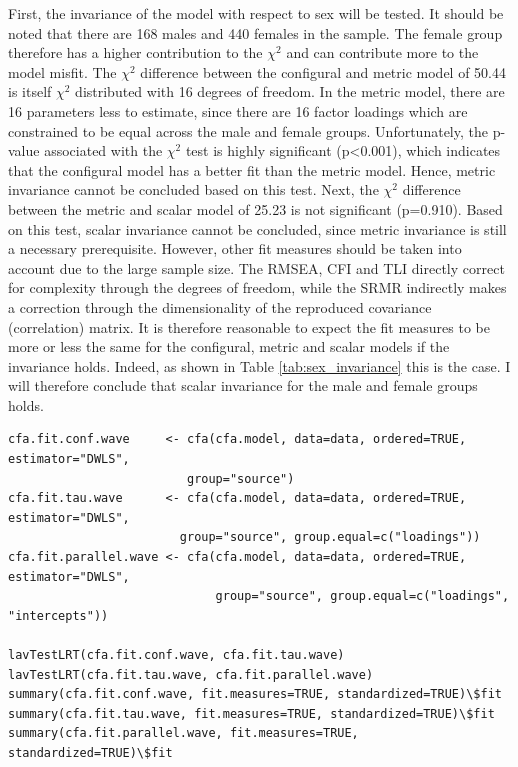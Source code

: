 \documentclass[11pt]{article}
\begin{document}
First, the invariance of the model with respect to sex will be tested. It
should be noted that there are 168 males and 440 females in the sample. The
female group therefore has a higher contribution to the $\chi^2$ and can
contribute more to the model misfit. The $\chi^2$ difference between the
configural and metric model of 50.44 is itself $\chi^2$ distributed with 16
degrees of freedom. In the metric model, there are 16 parameters less to
estimate, since there are 16 factor loadings which are constrained to be equal
across the male and female groups. Unfortunately, the p-value associated with
the $\chi^2$ test is highly significant (p<0.001), which indicates that the
configural model has a better fit than the metric model. Hence, metric
invariance cannot be concluded based on this test. Next, the $\chi^2$ difference
between the metric and scalar model of 25.23 is not significant (p=0.910). Based
on this test, scalar invariance cannot be concluded, since metric invariance is
still a necessary prerequisite. However, other fit measures should be taken into
account due to the large sample size. The RMSEA, CFI and TLI directly correct
for complexity through the degrees of freedom, while the SRMR indirectly makes a
correction through the dimensionality of the reproduced covariance (correlation)
matrix. It is therefore reasonable to expect the fit measures to be more or less
the same for the configural, metric and scalar models if the invariance holds.
Indeed, as shown in Table \ref{tab:sex_invariance} this is the case. I will
therefore conclude that scalar invariance for the male and female groups holds.

\begin{minipage}{\linewidth}
\begin{lstlisting}
cfa.fit.conf.wave     <- cfa(cfa.model, data=data, ordered=TRUE, estimator="DWLS",
                         group="source")
cfa.fit.tau.wave      <- cfa(cfa.model, data=data, ordered=TRUE, estimator="DWLS",
                        group="source", group.equal=c("loadings"))
cfa.fit.parallel.wave <- cfa(cfa.model, data=data, ordered=TRUE, estimator="DWLS",
                             group="source", group.equal=c("loadings", "intercepts"))

lavTestLRT(cfa.fit.conf.wave, cfa.fit.tau.wave)
lavTestLRT(cfa.fit.tau.wave, cfa.fit.parallel.wave)
summary(cfa.fit.conf.wave, fit.measures=TRUE, standardized=TRUE)\$fit
summary(cfa.fit.tau.wave, fit.measures=TRUE, standardized=TRUE)\$fit
summary(cfa.fit.parallel.wave, fit.measures=TRUE, standardized=TRUE)\$fit
\end{lstlisting}
\end{minipage}
\end{document}
